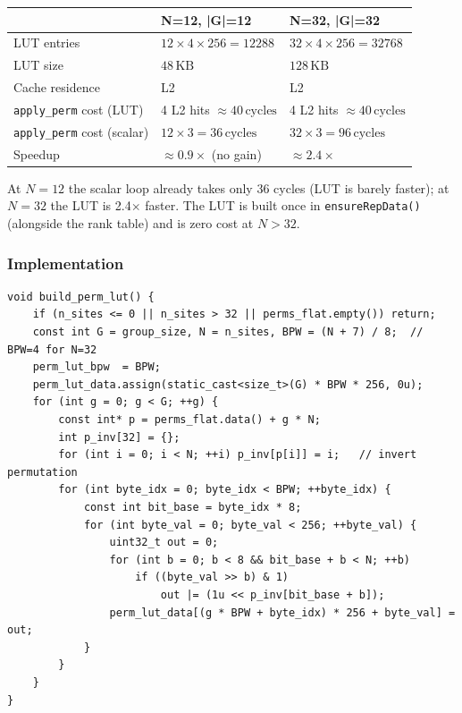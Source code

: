 \documentclass[11pt,a4paper]{article}
\begin{document}
\begin{center}
\begin{tabular}{@{}lll@{}}
\toprule
 & \textbf{N=12, |G|=12} & \textbf{N=32, |G|=32} \\
\midrule
LUT entries & $12 \times 4 \times 256 = 12288$ & $32 \times 4 \times 256 = 32768$ \\
LUT size & $48\,\mathrm{KB}$ & $128\,\mathrm{KB}$ \\
Cache residence & L2 & L2 \\
\texttt{apply\_perm} cost (LUT) & 4 L2 hits $\approx 40\,\mathrm{cycles}$ & 4 L2 hits $\approx 40\,\mathrm{cycles}$ \\
\texttt{apply\_perm} cost (scalar) & $12 \times 3 = 36\,\mathrm{cycles}$ & $32 \times 3 = 96\,\mathrm{cycles}$ \\
Speedup & $\approx 0.9\times$ (no gain) & $\approx 2.4\times$ \\
\bottomrule
\end{tabular}
\end{center}

At $N=12$ the scalar loop already takes only 36 cycles (LUT is barely faster);
at $N=32$ the LUT is 2.4$\times$ faster.  The LUT is built once in
\texttt{ensureRepData()} (alongside the rank table) and is zero cost at $N>32$.

\subsubsection{Implementation}

\begin{lstlisting}[caption={LUT build in RepSectorData::build\_perm\_lut() (rep\_sector\_data.h)}]
void build_perm_lut() {
    if (n_sites <= 0 || n_sites > 32 || perms_flat.empty()) return;
    const int G = group_size, N = n_sites, BPW = (N + 7) / 8;  // BPW=4 for N=32
    perm_lut_bpw  = BPW;
    perm_lut_data.assign(static_cast<size_t>(G) * BPW * 256, 0u);
    for (int g = 0; g < G; ++g) {
        const int* p = perms_flat.data() + g * N;
        int p_inv[32] = {};
        for (int i = 0; i < N; ++i) p_inv[p[i]] = i;   // invert permutation
        for (int byte_idx = 0; byte_idx < BPW; ++byte_idx) {
            const int bit_base = byte_idx * 8;
            for (int byte_val = 0; byte_val < 256; ++byte_val) {
                uint32_t out = 0;
                for (int b = 0; b < 8 && bit_base + b < N; ++b)
                    if ((byte_val >> b) & 1)
                        out |= (1u << p_inv[bit_base + b]);
                perm_lut_data[(g * BPW + byte_idx) * 256 + byte_val] = out;
            }
        }
    }
}
\end{lstlisting}
\end{document}
